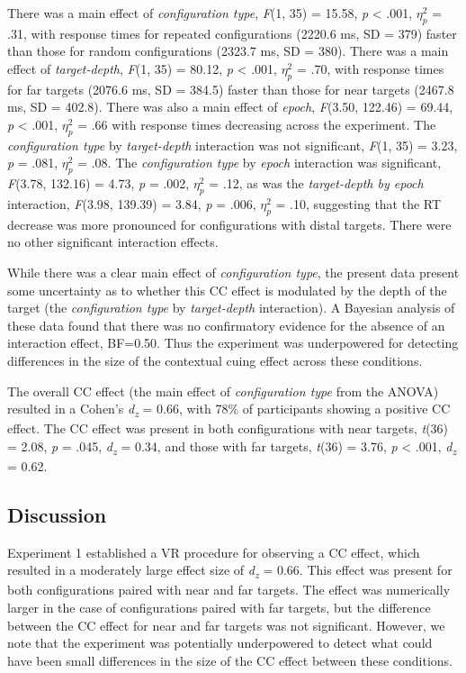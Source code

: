 \documentclass[
  english,
  man,floatsintext]{apa7}
\begin{document}
There was a main effect of \emph{configuration type}, \emph{F}(1, 35) = 15.58, \emph{p} \textless{} .001, \(\eta^2_p\) = .31, with response times for repeated configurations (2220.6 ms, SD = 379) faster than those for random configurations (2323.7 ms, SD = 380). There was a main effect of \emph{target-depth}, \emph{F}(1, 35) = 80.12, \emph{p} \textless{} .001, \(\eta^2_p\) = .70, with response times for far targets (2076.6 ms, SD = 384.5) faster than those for near targets (2467.8 ms, SD = 402.8). There was also a main effect of \emph{epoch}, \emph{F}(3.50, 122.46) = 69.44, \emph{p} \textless{} .001, \(\eta^2_p\) = .66 with response times decreasing across the experiment. The \emph{configuration type} by \emph{target-depth} interaction was not significant, \emph{F}(1, 35) = 3.23, \emph{p} = .081, \(\eta^2_p\) = .08. The \emph{configuration type} by \emph{epoch} interaction was significant, \emph{F}(3.78, 132.16) = 4.73, \emph{p} = .002, \(\eta^2_p\) = .12, as was the \emph{target-depth by epoch} interaction, \emph{F}(3.98, 139.39) = 3.84, \emph{p} = .006, \(\eta^2_p\) = .10, suggesting that the RT decrease was more pronounced for configurations with distal targets. There were no other significant interaction effects.

While there was a clear main effect of \emph{configuration type}, the present data present some uncertainty as to whether this CC effect is modulated by the depth of the target (the \emph{configuration type} by \emph{target-depth} interaction). A Bayesian analysis of these data found that there was no confirmatory evidence for the absence of an interaction effect, BF=0.50. Thus the experiment was underpowered for detecting differences in the size of the contextual cuing effect across these conditions.

The overall CC effect (the main effect of \emph{configuration type} from the ANOVA) resulted in a Cohen's \emph{d\textsubscript{z}} = 0.66, with 78\% of participants showing a positive CC effect. The CC effect was present in both configurations with near targets, \emph{t}(36) = 2.08, \emph{p} = .045, \emph{d\textsubscript{z}} = 0.34, and those with far targets, \emph{t}(36) = 3.76, \emph{p} \textless{} .001, \emph{d\textsubscript{z}} = 0.62.

\hypertarget{discussion}{%
\subsection{Discussion}\label{discussion}}

Experiment 1 established a VR procedure for observing a CC effect, which resulted in a moderately large effect size of \emph{d\textsubscript{z}} = 0.66. This effect was present for both configurations paired with near and far targets. The effect was numerically larger in the case of configurations paired with far targets, but the difference between the CC effect for near and far targets was not significant. However, we note that the experiment was potentially underpowered to detect what could have been small differences in the size of the CC effect between these conditions.
\end{document}
